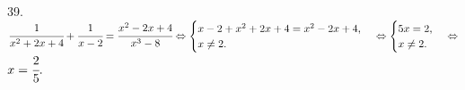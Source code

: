 39. $\cfrac{1}{x^2+2x+4}+\cfrac{1}{x-2}=\cfrac{x^2-2x+4}{x^3-8}\Leftrightarrow \begin{cases}x-2+x^2+2x+4=x^2-2x+4,\\ x\neq2.\end{cases}
\Leftrightarrow \begin{cases}5x=2,\\ x\neq2.\end{cases}\Leftrightarrow$\\$ x=\cfrac{2}{5}.$\\
